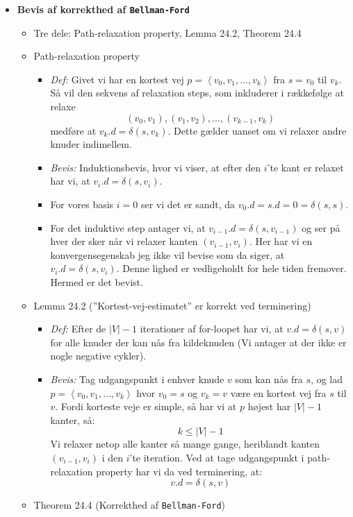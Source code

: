 \begin{itemize}
\item \textbf{Bevis af korrekthed af \texttt{Bellman-Ford}}
\begin{itemize}
	\item Tre dele: Path-relaxation property, Lemma 24.2, Theorem 24.4
	\item Path-relaxation property
	\begin{itemize}
		\item \textit{Def:} Givet vi har en kortest vej $p = \left< v_0, v_1, ..., v_k \right>$ fra $s = v_0$ til $v_k$. Så vil den sekvens af relaxation steps, som inkluderer i rækkefølge at relaxe
		$$
		(v_0, v_1), (v_1, v_2), ..., (v_{k-1}, v_k)
		$$
		medføre at $v_k.d = \delta(s, v_k)$. Dette gælder uanset om vi relaxer andre knuder indimellem.
		\item \textit{Bevis:} Induktionsbevis, hvor vi viser, at efter den $i$'te kant er relaxet har vi, at $v_i.d = \delta(s, v_i)$.
		\item For vores basis $i = 0$ ser vi det er sandt, da $v_0.d = s.d = 0 = \delta(s, s)$.
		\item For det induktive step antager vi, at $v_{i-1}.d = \delta(s, v_{i-1})$ og ser på hver der sker når vi relaxer kanten $(v_{i-1}, v_i)$. Her har vi en konvergensegenskab jeg ikke vil bevise som da siger, at $v_i.d = \delta(s, v_i)$. Denne lighed er vedligeholdt for hele tiden fremover. Hermed er det bevist.
	\end{itemize}
	\item Lemma 24.2 (''Kortest-vej-estimatet'' er korrekt ved terminering)
	\begin{itemize}
		\item \textit{Def:} Efter de $|V| - 1$ iterationer af for-loopet har vi, at $v.d = \delta(s, v)$ for alle knuder der kan nås fra kildeknuden (Vi antager at der ikke er nogle negative cykler).
		\item \textit{Bevis:} Tag udgangspunkt i enhver knude $v$ som kan nås fra $s$, og lad $p = \left< v_0, v_1, ..., v_k \right>$ hvor $v_0 = s$ og $v_k = v$ være en kortest vej fra $s$ til $v$. Fordi korteste veje er simple, så har vi at $p$ højest har $|V| - 1$ kanter, så:
		$$
		k \leq |V| - 1
		$$
		Vi relaxer netop alle kanter så mange gange, heriblandt kanten $(v_{i-1}, v_i)$ i den $i$'te iteration. Ved at tage udgangspunkt i path-relaxation property har vi da ved terminering, at:
		$$
		v.d = \delta(s, v)
		$$
	\end{itemize}
	\item Theorem 24.4 (Korrekthed af \texttt{Bellman-Ford})

\end{itemize}
\end{itemize}
